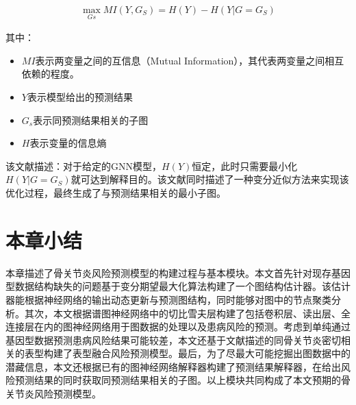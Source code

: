 \begin{equation}\begin{aligned}
    \max_{Gs} MI (Y, G_S) = H(Y) - H(Y|G=G_S)
\end{aligned}\end{equation}

其中：

\begin{itemize}
\item
  \(MI\)表示两变量之间的互信息（Mutual
  Information），其代表两变量之间相互依赖的程度。
\item
  \(Y\)表示模型给出的预测结果
\item
  \(G_s\)表示同预测结果相关的子图
\item
  \(H\)表示变量的信息熵
\end{itemize}

该文献描述：对于给定的GNN模型，$H(Y)$恒定，此时只需要最小化$ H(Y|G=G_S)$就可达到解释目的。该文献同时描述了一种变分近似方法来实现该优化过程，最终生成了与预测结果相关的最小子图。

\section{本章小结}
本章描述了骨关节炎风险预测模型的构建过程与基本模块。本文首先针对现存基因型数据结构缺失的问题基于变分期望最大化算法构建了一个图结构估计器。该估计器能根据神经网络的输出动态更新与预测图结构，同时能够对图中的节点聚类分析。其次，本文根据谱图神经网络中的切比雪夫层构建了包括卷积层、读出层、全连接层在内的图神经网络用于图数据的处理以及患病风险的预测。考虑到单纯通过基因型数据预测患病风险结果可能较差，本文还基于文献描述的同骨关节炎密切相关的表型构建了表型融合风险预测模型。最后，为了尽最大可能挖掘出图数据中的潜藏信息，本文还根据已有的图神经网络解释器构建了预测结果解释器，在给出风险预测结果的同时获取同预测结果相关的子图。以上模块共同构成了本文预期的骨关节炎风险预测模型。 